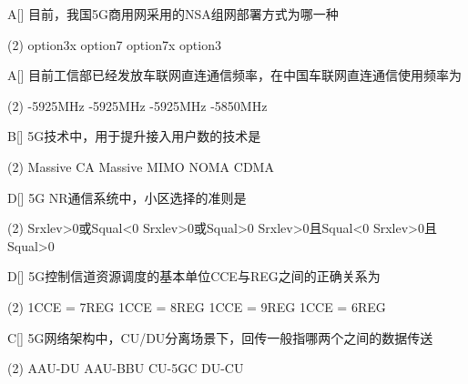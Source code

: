 \begin{choice}{A}[]
    目前，我国5G商用网采用的NSA组网部署方式为哪一种

    \begin{tasks}(2)
        \task option3x
        \task option7
        \task option7x
        \task option3
    \end{tasks}
\end{choice}


\begin{choice}{A}[]
    目前工信部已经发放车联网直连通信频率，在中国车联网直连通信使用频率为
    \begin{tasks}(2)
        -5925MHz
        -5925MHz
        -5925MHz
        -5850MHz
    \end{tasks}
\end{choice}


\begin{choice}{B}[]
    5G技术中，用于提升接入用户数的技术是
    \begin{tasks}(2)
        \task Massive CA
        \task Massive MIMO
        \task NOMA
        \task CDMA
    \end{tasks}
\end{choice}


\begin{choice}{D}[]
    5G NR通信系统中，小区选择的准则是
    \begin{tasks}(2)
        \task Srxlev>0或Squal<0
        \task Srxlev>0或Squal>0
        \task Srxlev>0且Squal<0
        \task Srxlev>0且Squal>0
    \end{tasks}
\end{choice}


\begin{choice}{D}[]
    5G控制信道资源调度的基本单位CCE与REG之间的正确关系为
    \begin{tasks}(2)
        \task 1CCE = 7REG
        \task 1CCE = 8REG
        \task 1CCE = 9REG
        \task 1CCE = 6REG
    \end{tasks}
\end{choice}

\begin{choice}{C}[]
    5G网络架构中，CU/DU分离场景下，回传一般指哪两个之间的数据传送
    \begin{tasks}(2)
        \task AAU-DU
        \task AAU-BBU
        \task CU-5GC
        \task DU-CU
    \end{tasks}
\end{choice}

